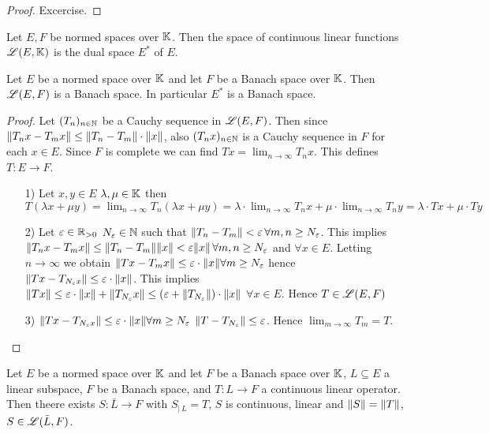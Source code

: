 \begin{proof}
Excercise.
\end{proof}

\begin{definition}
Let $E,F$ be normed spaces over $\mathbb{K}$. Then the space of continuous linear functions $\mathscr{L}(E,\mathbb{K})$  is the dual space $E^{*}$ of $E$.
\end{definition}

\begin{theo}
Let $E$ be a normed space over $\mathbb{K}$ and let $F$ be a Banach space over $\mathbb{K}$. Then $\mathscr{L}(E,F)$ is a Banach space. In particular $E^{*}$ is a Banach space.
\end{theo}

\begin{proof}
Let $(T_n)_{n \in \mathbb{N}}$ be a Cauchy sequence in $\mathscr{L}(E,F)$. Then since $\Vert T_n x - T_m x \Vert \le \Vert T_n - T_m \Vert\cdot \Vert x \Vert$, also $(T_n x)_{n \in \mathbb{N}}$ is a Cauchy sequence in $F$ for each $x \in E$. Since $F$ is complete we can find $Tx = \lim_{n \rightarrow \infty} T_n x$. This defines $T:E \rightarrow F$.
\begin{enumerate}
	\item[1)]Let $x,y \in E$ $\lambda, \mu \in \mathbb{K}$ then $T(\lambda x + \mu y) = \lim_{n \rightarrow \infty} T_n(\lambda x + \mu y) =  \lambda \cdot \lim_{n \rightarrow \infty} T_n x + \mu \cdot \lim_{n \rightarrow \infty} T_n y = \lambda \cdot T x + \mu \cdot T y $
	\item[2)] Let $\varepsilon \in \mathbb{R}_{>0}$ $N_{\varepsilon} \in \mathbb{N}$ such that $\Vert T_n - T_m \Vert < \varepsilon \, \forall m,n \ge N_{\varepsilon}$. This implies $\Vert T_n x - T_m x \Vert \le \Vert T_n - T_m \Vert \Vert x \Vert < \varepsilon \Vert x \Vert \, \forall m,n \ge N_{\varepsilon}$ and $\forall x \in E$. Letting $n \rightarrow \infty$ we obtain $\Vert Tx - T_{m} x \Vert \le \varepsilon \cdot \Vert x \Vert \forall m \ge N_{\varepsilon}$ hence $\Vert Tx - T_{N_{\varepsilon} x} \Vert \le \varepsilon \cdot \Vert x \Vert$. This implies $\Vert Tx \Vert \le \varepsilon \cdot \Vert x \Vert + \Vert T_{ N_{\varepsilon}} x \Vert \le (\varepsilon + \Vert T_{N_{\varepsilon}} \Vert) \cdot \Vert x \Vert$ $\forall x \in E$. Hence $T \in \mathscr{L}(E,F)$
	\item[3)] $\Vert Tx - T_{N_{\varepsilon} x} \Vert \le \varepsilon \cdot \Vert x \Vert \forall m \ge N_{\varepsilon}$ $\Vert T - T_{N_{\varepsilon}} \Vert \le \varepsilon$. Hence  $\lim_{m \rightarrow \infty} T_m = T$.
\end{enumerate}
\end{proof}

\begin{theo}
Let $E$ be a normed space over $\mathbb{K}$ and let $F$ be a Banach space over $\mathbb{K}$, $L \subseteq E$ a linear subspace, $F$ be a Banach space, and $T: L \rightarrow F$ a continuous linear operator. Then theere exists $S: \bar{L} \rightarrow F$ with $S_{| \, L} = T$, $S$ is continuous, linear and  $\Vert S \Vert = \Vert T \Vert $, $S \in \mathscr{L}(\bar{L}, F)$.
\end{theo}

